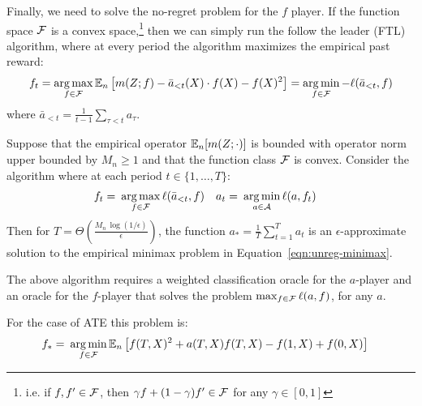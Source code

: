 Finally, we need to solve the no-regret problem for the $f$ player. If the function space ${\mathcal F}$ is a convex space,\footnote{i.e. if $f,f'\in {\mathcal F}$, then $\gamma f+(1-\gamma)f'\in {\mathcal F}$ for any $\gamma\in [0, 1]$} then we can simply run the follow the leader (FTL) algorithm, where at every period the algorithm maximizes the empirical past reward:
\begin{equation}
    f_t = \operatorname*{arg\,max}_{f\in {\mathcal F}} \mathbb{E}_n\left[m(Z;f) - \bar{a}_{< t}(X)\cdot f(X) - f(X)^2\right] = \operatorname*{arg\,min}_{f\in {\mathcal F}} -\ell(\bar{a}_{<t}, f)
\end{equation}
where $\bar{a}_{<t} = \frac{1}{t-1} \sum_{\tau<t} a_{\tau}$.

\begin{proposition}\label{prop:oracle}
Suppose that the empirical operator $\mathbb{E}_n[m(Z; \cdot)]$ is bounded with operator norm upper bounded by $M_n\geq 1$ and that the function class ${\mathcal F}$ is convex. Consider the algorithm where at each period $t\in \{1, \ldots, T\}$:
\begin{align}
    f_t =~& \operatorname*{arg\,max}_{f\in {\mathcal F}} \ell(\bar{a}_{<t}, f) & a_t =~& \operatorname*{arg\,min}_{a\in {\mathcal A}} \ell(a, f_t)
\end{align}
Then for $T=\Theta\left(\frac{M_n\, \log(1/\epsilon)}{\epsilon}\right)$, the function $a_*=\frac{1}{T}\sum_{t=1}^T a_t$ is an $\epsilon$-approximate solution to the empirical minimax problem in Equation~\eqref{eqn:unreg-minimax}.
\end{proposition}

The above algorithm requires a weighted classification oracle for the $a$-player and an oracle for the $f$-player that solves the problem $\max_{f\in {\mathcal F}} \ell(a, f)$, for any $a$.

\begin{example}
For the case of ATE this problem is:
\begin{align}
    f_* =~& \operatorname*{arg\,min}_{f\in {\mathcal F}} \mathbb{E}_n\left[f(T, X)^2 + a(T, X) f(T, X) - f(1, X) + f(0, X)\right]
\end{align}
\end{example}
